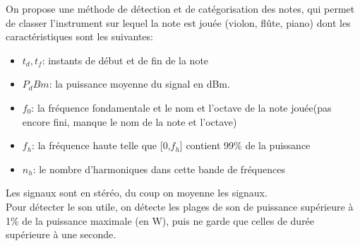 On propose une méthode de détection et de catégorisation des notes, qui permet de classer l'instrument sur lequel la note est jouée (violon, flûte, piano) dont les caractéristiques sont les suivantes: 
\begin{itemize}
  \item $t_d,t_f$: instants de début et de fin de la note
  \item $P_dBm$: la puissance moyenne du signal en dBm.
  \item $f_0$: la fréquence fondamentale et le nom et l'octave de la note jouée(pas encore fini, manque le nom de la note et l'octave)
  \item $f_h$: la fréquence haute telle que [0,$f_h$] contient 99\% de la puissance
  \item $n_h$: le nombre d'harmoniques dans cette bande de fréquences
\end{itemize}
Les signaux sont en stéréo, du coup on moyenne les signaux. \\
Pour détecter le son utile, on détecte les plages de son de puissance supérieure à 1\%  de la puissance maximale (en W), puis ne garde que celles de durée supérieure à une seconde. \\
